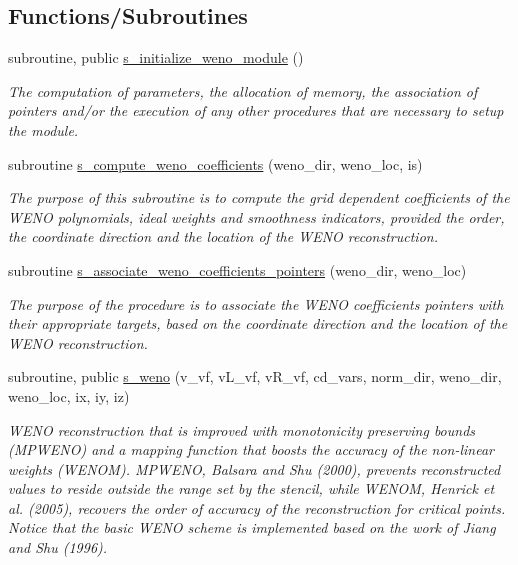 \subsection*{Functions/\+Subroutines}
\begin{DoxyCompactItemize}
\item 
subroutine, public \hyperlink{namespacem__weno_a0c42f0718a03dafe119ac88c17bcda78}{s\+\_\+initialize\+\_\+weno\+\_\+module} ()
\begin{DoxyCompactList}\small\item\em The computation of parameters, the allocation of memory, the association of pointers and/or the execution of any other procedures that are necessary to setup the module. \end{DoxyCompactList}\item 
subroutine \hyperlink{namespacem__weno_ac16dc64bea94d533366e3462ddb351a6}{s\+\_\+compute\+\_\+weno\+\_\+coefficients} (weno\+\_\+dir, weno\+\_\+loc, is)
\begin{DoxyCompactList}\small\item\em The purpose of this subroutine is to compute the grid dependent coefficients of the W\+E\+NO polynomials, ideal weights and smoothness indicators, provided the order, the coordinate direction and the location of the W\+E\+NO reconstruction. \end{DoxyCompactList}\item 
subroutine \hyperlink{namespacem__weno_adcb329b727281d1855405733054b996e}{s\+\_\+associate\+\_\+weno\+\_\+coefficients\+\_\+pointers} (weno\+\_\+dir, weno\+\_\+loc)
\begin{DoxyCompactList}\small\item\em The purpose of the procedure is to associate the W\+E\+NO coefficients\textquotesingle{} pointers with their appropriate targets, based on the coordinate direction and the location of the W\+E\+NO reconstruction. \end{DoxyCompactList}\item 
subroutine, public \hyperlink{namespacem__weno_a1bf39ea6e0044dcc912763ff5acac69d}{s\+\_\+weno} (v\+\_\+vf, v\+L\+\_\+vf, v\+R\+\_\+vf, cd\+\_\+vars, norm\+\_\+dir, weno\+\_\+dir, weno\+\_\+loc, ix, iy, iz)
\begin{DoxyCompactList}\small\item\em W\+E\+NO reconstruction that is improved with monotonicity preserving bounds (M\+P\+W\+E\+NO) and a mapping function that boosts the accuracy of the non-\/linear weights (W\+E\+N\+OM). M\+P\+W\+E\+NO, Balsara and Shu (2000), prevents reconstructed values to reside outside the range set by the stencil, while W\+E\+N\+OM, Henrick et al. (2005), recovers the order of accuracy of the reconstruction for critical points. Notice that the basic W\+E\+NO scheme is implemented based on the work of Jiang and Shu (1996). \end{DoxyCompactList}\item 

\end{DoxyCompactItemize}
